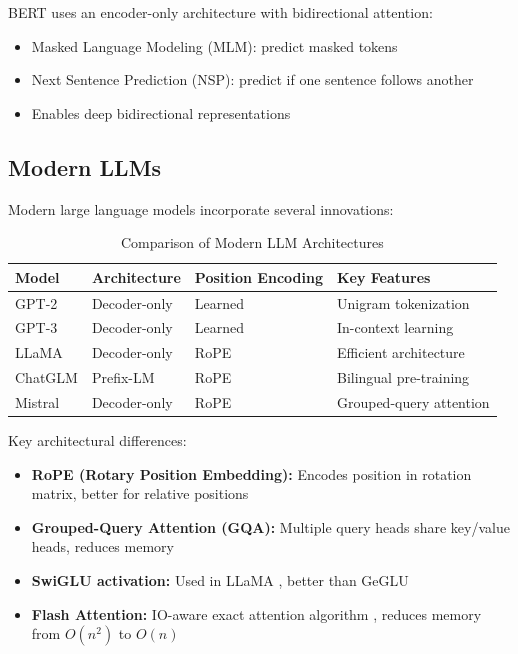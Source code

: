 BERT \cite{devlin2018bert} uses an encoder-only architecture with bidirectional attention:
\begin{itemize}
    \item Masked Language Modeling (MLM): predict masked tokens
    \item Next Sentence Prediction (NSP): predict if one sentence follows another
    \item Enables deep bidirectional representations
\end{itemize}

\subsection{Modern LLMs}

Modern large language models incorporate several innovations:

\begin{table}[ht]
    \centering
    \caption{Comparison of Modern LLM Architectures}
    \begin{tabular}{L{2.5cm} L{3cm} L{3cm} L{3cm}}
        \toprule
        \textbf{Model} & \textbf{Architecture} & \textbf{Position Encoding} & \textbf{Key Features} \\
        \midrule
        GPT-2 & Decoder-only & Learned & Unigram tokenization \\
        GPT-3 & Decoder-only & Learned & In-context learning \\
        LLaMA & Decoder-only & RoPE & Efficient architecture \\
        ChatGLM & Prefix-LM & RoPE & Bilingual pre-training \\
        Mistral & Decoder-only & RoPE & Grouped-query attention \\
        \bottomrule
    \end{tabular}
\end{table}

Key architectural differences:
\begin{itemize}
    \item \textbf{RoPE (Rotary Position Embedding):} Encodes position in rotation matrix, better for relative positions
    \item \textbf{Grouped-Query Attention (GQA):} Multiple query heads share key/value heads, reduces memory
    \item \textbf{SwiGLU activation:} Used in LLaMA \cite{touvron2023llama}, better than GeGLU
    \item \textbf{Flash Attention:} IO-aware exact attention algorithm \cite{dao2022flashattention}, reduces memory from $O(n^2)$ to $O(n)$
\end{itemize}

